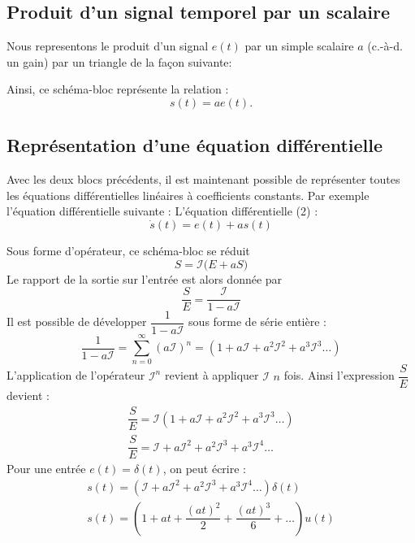 \subsection{Produit d'un signal temporel par un scalaire}
Nous representons le produit d'un signal $e(t)$ par un simple scalaire $a$
(c.-à-d. un gain) par un triangle de la façon suivante:
\begin{center}
    
\end{center}
Ainsi, ce schéma-bloc représente la relation : 
\[
    s(t)=ae(t).
\]
\subsection{Représentation d'une équation différentielle}
Avec les deux blocs précédents, il est maintenant possible de représenter 
toutes les équations différentielles linéaires à coefficients constants.
Par exemple l'équation différentielle suivante :
L'équation différentielle (2) :
\[
    \dot{s}(t)=e(t)+as(t)
\]

\begin{center}
    
\end{center}

Sous forme d'opérateur, ce schéma-bloc se réduit
\[
    S=\mathcal{I}\big(E+aS\big)
\]
Le rapport de la sortie sur l'entrée est alors donnée par 
\[
    \dfrac{S}{E}=\dfrac{\mathcal{I}}{1-a\mathcal{I}}
\]
Il est possible de développer $\dfrac{1}{1-a\mathcal{I}}$ sous forme de série entière :
\[
    \dfrac{1}{1-a\mathcal{I}}=\sum_{n=0}^{\infty}(a\mathcal{I})^n=(1+a\mathcal{I}+a^2\mathcal{I}^2+a^3\mathcal{I}^3\ldots)
\]
L'application de l'opérateur $\mathcal{I}^n$ revient à appliquer $\mathcal{I}$ $n$ fois.
Ainsi l'expression $\dfrac{S}{E}$ devient :
\begin{align*}
    \dfrac{S}{E}=\mathcal{I}\left(1+a\mathcal{I}+a^2\mathcal{I}^2+a^3\mathcal{I}^3\ldots\right)\\
    \dfrac{S}{E}=\mathcal{I}+a\mathcal{I}^2+a^2\mathcal{I}^3+a^3\mathcal{I}^4\ldots
\end{align*}
Pour une entrée $e(t)=\delta(t)$, on peut écrire :
\begin{align*}
    s(t)=\left(\mathcal{I}+a\mathcal{I}^2+a^2\mathcal{I}^3+a^3\mathcal{I}^4\ldots\right)\delta(t)\\
    s(t)=(1+at+\dfrac{(at)^2}{2}+\dfrac{(at)^3}{6}+\ldots)u(t)
\end{align*}

